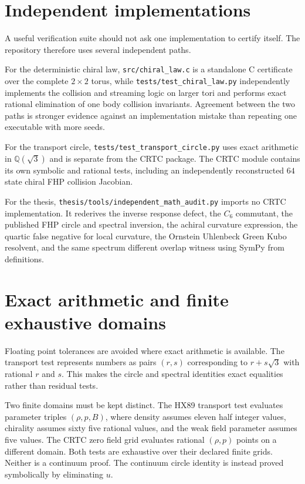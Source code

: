 \section{Independent implementations}
A useful verification suite should not ask one implementation to certify itself. The repository therefore uses several independent paths.

For the deterministic chiral law, \texttt{src/chiral\_law.c} is a standalone C certificate over the complete $2\times2$ torus, while \texttt{tests/test\_chiral\_law.py} independently implements the collision and streaming logic on larger tori and performs exact rational elimination of one body collision invariants. Agreement between the two paths is stronger evidence against an implementation mistake than repeating one executable with more seeds.

For the transport circle, \texttt{tests/test\_transport\_circle.py} uses exact arithmetic in $\mathbb{Q}(\sqrt3)$ and is separate from the CRTC package. The CRTC module contains its own symbolic and rational tests, including an independently reconstructed $64$ state chiral FHP collision Jacobian.

For the thesis, \texttt{thesis/tools/independent\_math\_audit.py} imports no CRTC implementation. It rederives the inverse response defect, the $C_6$ commutant, the published FHP circle and spectral inversion, the achiral curvature expression, the quartic false negative for local curvature, the Ornstein Uhlenbeck Green Kubo resolvent, and the same spectrum different overlap witness using SymPy from definitions.

\section{Exact arithmetic and finite exhaustive domains}
Floating point tolerances are avoided where exact arithmetic is available. The transport test represents numbers as pairs $(r,s)$ corresponding to $r+s\sqrt3$ with rational $r$ and $s$. This makes the circle and spectral identities exact equalities rather than residual tests.

Two finite domains must be kept distinct. The HX89 transport test evaluates \HXTransportGridPoints{} parameter triples $(\rho,p,B)$, where density assumes eleven half integer values, chirality assumes sixty five rational values, and the weak field parameter assumes five values. The CRTC zero field grid evaluates \CRTCBoltzmannGridPoints{} rational $(\rho,p)$ points on a different domain. Both tests are exhaustive over their declared finite grids. Neither is a continuum proof. The continuum circle identity is instead proved symbolically by eliminating $u$.

